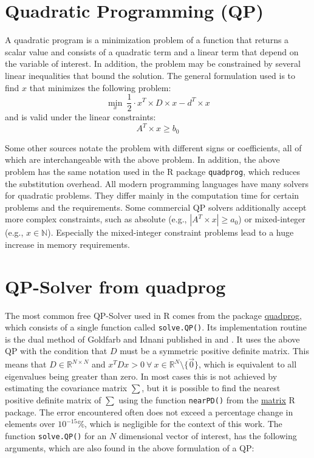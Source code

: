 \documentclass[
  oneside]{book}
\begin{document}
\hypertarget{quadratic-programming-qp}{%
\section{Quadratic Programming (QP)}\label{quadratic-programming-qp}}

A quadratic program is a minimization problem of a function that returns a scalar value and consists of a quadratic term and a linear term that depend on the variable of interest. In addition, the problem may be constrained by several linear inequalities that bound the solution. The general formulation used is to find \(x\) that minimizes the following problem:
\[
  \min\limits_{x} \ \frac{1}{2} \cdot x^T \times D \times x - d^T \times x 
\]
and is valid under the linear constraints:
\[
  A^T \times x \geq b_0
\]

Some other sources notate the problem with different signs or coefficients, all of which are interchangeable with the above problem. In addition, the above problem has the same notation used in the R package \texttt{quadprog}, which reduces the substitution overhead. All modern programming languages have many solvers for quadratic problems. They differ mainly in the computation time for certain problems and the requirements. Some commercial QP solvers additionally accept more complex constraints, such as absolute (e.g., \(|A^T \times x| \geq a_0\)) or mixed-integer (e.g., \(x \in \mathbb{N}\)). Especially the mixed-integer constraint problems lead to a huge increase in memory requirements.

\hypertarget{qp-solver-from-quadprog}{%
\section{QP-Solver from quadprog}\label{qp-solver-from-quadprog}}

The most common free QP-Solver used in R comes from the package \href{https://cran.r-project.org/web/packages/quadprog/quadprog.pdf}{quadprog}, which consists of a single function called \texttt{solve.QP()}. Its implementation routine is the dual method of Goldfarb and Idnani published in \citep{GoId1982} and \citep{GoId1983}. It uses the above QP with the condition that \(D\) must be a symmetric positive definite matrix. This means that \(D\in \mathbb{R}^{N \times N}\) and \(x^T D x > 0 \ \forall \ x \in \mathbb{R}^N \setminus \{\vec{0}\}\), which is equivalent to all eigenvalues being greater than zero. In most cases this is not achieved by estimating the covariance matrix \(\sum\), but it is possible to find the nearest positive definite matrix of \(\textstyle\sum\) using the function \texttt{nearPD()} from the \href{https://cran.r-project.org/web/packages/Matrix/Matrix.pdf}{matrix} R package. The error encountered often does not exceed a percentage change in elements over \(10^{-15} \%\), which is negligible for the context of this work. The function \texttt{solve.QP()} for an \(N\) dimensional vector of interest, has the following arguments, which are also found in the above formulation of a QP:
\end{document}
